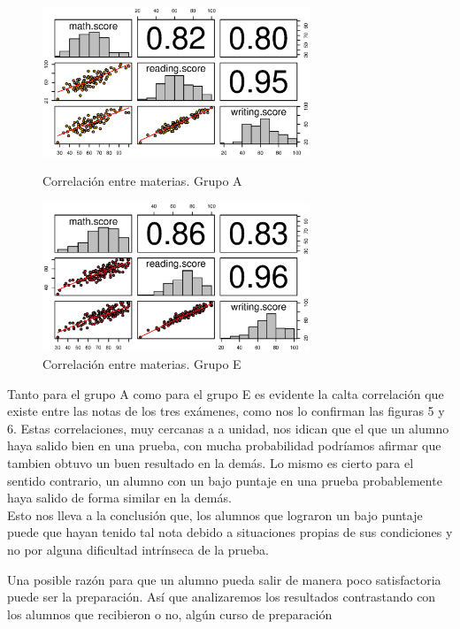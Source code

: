 \documentclass{article}
\begin{document}
    \begin{figure}[ht]
        \begin{minipage}[b]{0.45\linewidth}
            \includegraphics[width=8cm]{Output/Plots/5CorrgrupoA.eps}
            \vspace*{-8.5mm}
            \caption{Correlaci\'on entre materias. Grupo A}
            \label{fig:minipage1}
        \end{minipage}
        \hspace{0.2cm}
        \begin{minipage}[b]{0.45\linewidth}
            \includegraphics[width=8cm]{Output/Plots/6CorrelaciongrupoE.eps}
            \vspace*{-9mm}
            \caption{Correlaci\'on entre materias. Grupo E}
            \label{fig:minipage2}
        \end{minipage}
    \end{figure}

    Tanto para el grupo A como para el grupo E es evidente la calta correlaci\'on que existe entre las notas de los tres ex\'amenes,
     como nos lo confirman las figuras 5 y 6. Estas correlaciones, muy cercanas a a unidad, nos idican que el que un alumno haya salido
     bien en una prueba, con mucha probabilidad podr\'iamos afirmar que tambien obtuvo un buen resultado en la dem\'as. Lo mismo
     es cierto para el sentido contrario, un alumno con un bajo puntaje en una prueba probablemente haya salido de forma similar en la dem\'as.\\

     Esto nos lleva a la conclusi\'on que, los alumnos que lograron un bajo puntaje puede que hayan tenido tal nota debido a
     situaciones propias de sus condiciones y no por alguna dificultad intr\'inseca de la prueba.


    Una posible raz\'on para que un alumno pueda salir de manera poco satisfactoria puede ser la preparaci\'on. As\'i que analizaremos
    los resultados contrastando con los alumnos que recibieron o no, alg\'un curso de preparaci\'on
\end{document}
